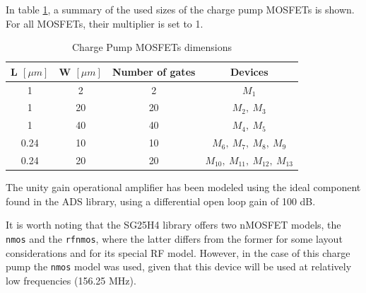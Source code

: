 \documentclass[lettersize,journal]{IEEEtran}
\begin{document}
In table \ref{tab:cp_mos_size}, a summary of the used sizes of the charge pump MOSFETs is shown. For all MOSFETs, their multiplier is set to 1.

\begin{table}[!ht]
    \renewcommand{\arraystretch}{1.5}
    \centering
    \caption{Charge Pump MOSFETs dimensions}
    \label{tab:cp_mos_size}
    \begin{tabular}{|c|c|c|c|}
    \hline
    \textbf{L \([\mu m]\)} & \textbf{W \([\mu m]\)} & \textbf{Number of gates} & \textbf{Devices} \\ \hline
    1               & 2              & 2                        & $M_1$                  \\ \hline
    1               & 20             & 20                       & $M_2,\ M_3$                 \\ \hline
    1               & 40             & 40                       & $M_4,\ M_5$                 \\ \hline
    0.24            & 10             & 10                       & $M_6,\ M_7,\ M_8,\ M_9$                   \\ \hline
    0.24            & 20             & 20                       & $M_{10},\ M_{11},\ M_{12},\ M_{13}$                 \\ \hline
    \end{tabular}
\end{table}

The unity gain operational amplifier has been modeled using the ideal component found in the ADS library, using a differential open loop gain of 100 dB.

It is worth noting that the SG25H4 library offers two nMOSFET models, the \texttt{nmos} and the \texttt{rfnmos}, where the latter differs from the former for some layout considerations and for its special RF model. However, in the case of this charge pump the \texttt{nmos} model was used, given that this device will be used at relatively low frequencies (156.25 MHz). 
\end{document}
